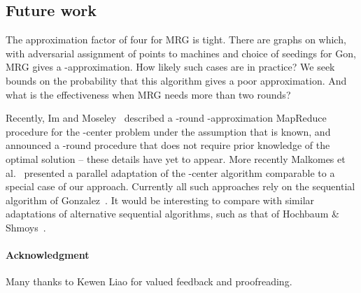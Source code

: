 \documentclass[11pt]{article}
\newcommand{\ours}{{\sc MRG}\xspace}
\newcommand{\gon}{{\sc Gon}\xspace}
\begin{document}
\subsection*{Future work}
The approximation factor of four for \ours is tight.
There are graphs on which,
with adversarial  assignment of points to machines and choice of seedings
for \gon,
 \ours gives a -approximation.
How likely such cases are in practice?
We seek bounds on the probability that this algorithm gives a poor approximation.
And what is the effectiveness when \ours needs more than two rounds?

Recently, Im and Moseley~\cite{im2015} described a
-round -approximation MapReduce procedure for the -center problem
under the assumption that  is known, and announced a -round procedure that does not require prior knowledge of the optimal solution -- 
these details have yet to appear.
More recently Malkomes et al.~\cite{malkomes2015fast} presented a parallel adaptation of the -center algorithm comparable to a special case of our approach.
Currently all such approaches rely on the sequential algorithm of Gonzalez~\cite{gonzalez1985clustering}. 
It would be interesting to compare with similar adaptations of alternative sequential algorithms, such as that of Hochbaum \& Shmoys~\cite{hochbaum1985best}.


\vspace{3mm}
\paragraph*{Acknowledgment}
Many thanks to Kewen Liao for valued feedback and proofreading.

\newpage




\end{document}
